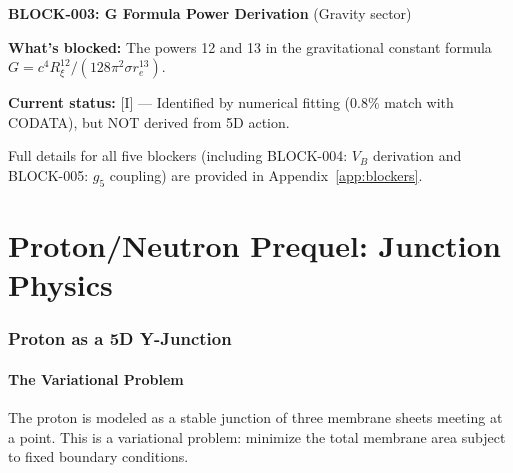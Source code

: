 \documentclass[11pt,a4paper]{article}
\begin{document}
\begin{warnbox}
\textbf{BLOCK-003: G Formula Power Derivation} (Gravity sector)

\textbf{What's blocked:} The powers 12 and 13 in the gravitational constant formula $G = c^4 R_\xi^{12}/(128\pi^2 \sigma r_e^{13})$.

\textbf{Current status:} [I] --- Identified by numerical fitting (0.8\% match with CODATA), but NOT derived from 5D action.
\end{warnbox}

Full details for all five blockers (including BLOCK-004: $V_B$ derivation and BLOCK-005: $g_5$ coupling) are provided in Appendix~\ref{app:blockers}.

\newpage


\part{Proton/Neutron Prequel: Junction Physics}

\section{Proton as a 5D Y-Junction}
\label{sec:proton_junction}

\subsection{The Variational Problem}

The proton is modeled as a stable junction of three membrane sheets meeting at a point. This is a variational problem: minimize the total membrane area subject to fixed boundary conditions.
\end{document}
